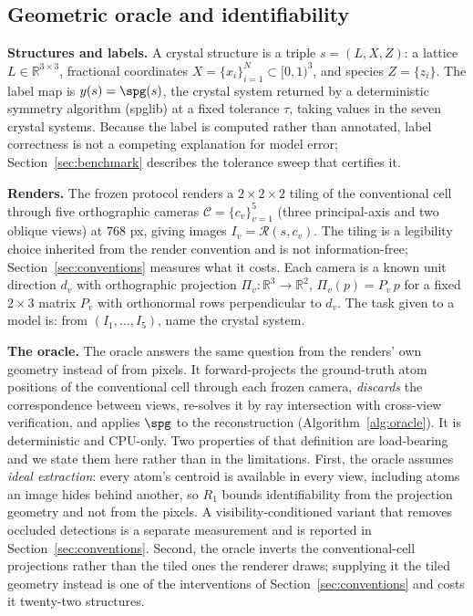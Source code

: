 \subsection{Geometric oracle and identifiability}
\label{sec:oracle}

\textbf{Structures and labels.} A crystal structure is a triple $s = (L, X, Z)$: a lattice
$L \in \mathbb{R}^{3\times3}$, fractional coordinates $X = \{x_i\}_{i=1}^{N} \subset [0,1)^3$, and species
$Z = \{z_i\}$. The label map is $y(s) = \spg(s)$, the crystal system returned by a deterministic symmetry
algorithm (spglib) at a fixed tolerance $\tau$, taking values in the seven crystal systems. Because the
label is computed rather than annotated, label correctness is not a competing explanation for model error;
Section~\ref{sec:benchmark} describes the tolerance sweep that certifies it.

\textbf{Renders.} The frozen protocol renders a $2\times2\times2$ tiling of the conventional cell through
five orthographic cameras $\mathcal{C} = \{c_v\}_{v=1}^{5}$ (three principal-axis and two oblique views) at
$768$ px, giving images $I_v = \mathcal{R}(s, c_v)$. The tiling is a legibility choice inherited from the
render convention and is not information-free; Section~\ref{sec:conventions} measures what it costs. Each camera is a known unit direction $d_v$ with orthographic projection
$\Pi_v : \mathbb{R}^3 \to \mathbb{R}^2$, $\Pi_v(p) = P_v\, p$ for a fixed $2\times3$ matrix $P_v$ with
orthonormal rows perpendicular to $d_v$. The task given to a model is: from $(I_1,\dots,I_5)$, name the
crystal system.

\textbf{The oracle.} The oracle answers the same question from the renders' own geometry instead of from
pixels. It forward-projects the ground-truth atom positions of the conventional cell through each frozen
camera, \emph{discards} the correspondence between views, re-solves it by ray intersection with cross-view
verification, and applies $\spg$ to the reconstruction (Algorithm~\ref{alg:oracle}). It is deterministic
and CPU-only. Two properties of that definition are load-bearing and we state them here rather than in the
limitations. First, the oracle assumes \emph{ideal extraction}: every atom's centroid is available in every
view, including atoms an image hides behind another, so $R_1$ bounds identifiability from the projection
geometry and not from the pixels. A visibility-conditioned variant that removes occluded detections is a
separate measurement and is reported in Section~\ref{sec:conventions}. Second, the oracle inverts the
conventional-cell projections rather than the tiled ones the renderer draws; supplying it the tiled geometry
instead is one of the interventions of Section~\ref{sec:conventions} and costs it twenty-two structures.

